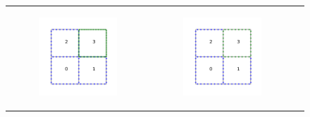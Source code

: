 \begin{figure}
\begin{tabular}{ccc}
\begin{subfigure}[t]{0.3\textwidth}
            \includegraphics[width=\textwidth, clip=true, trim={100 150 100 150}]{figures/adaptive_merge2.pdf}
        \end{subfigure}
        &
        \begin{subfigure}[t]{0.3\textwidth}
            \centering
            \includegraphics[width=\textwidth, clip=true, trim={100 150 100 150}]{figures/adaptive_merge3.pdf}

\end{subfigure}
\end{tabular}
\end{figure}

